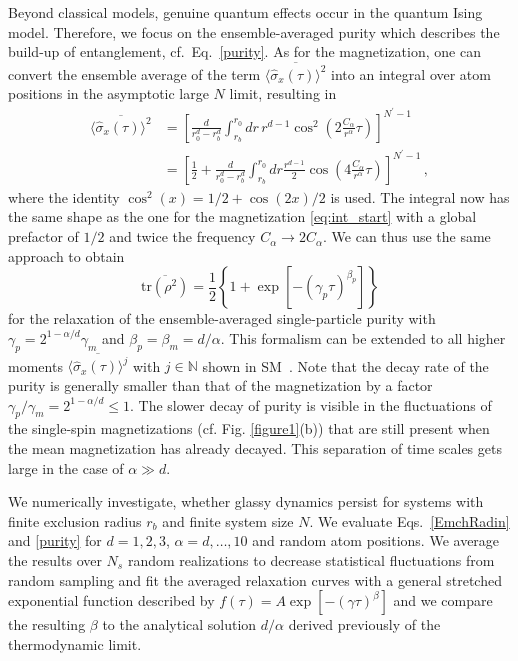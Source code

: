 \documentclass[aps,twocolumn,
superscriptaddress,
footinbib,
prl]{revtex4-1}
\begin{document}
Beyond classical models, genuine quantum effects occur in the quantum Ising model. Therefore, we focus on the ensemble-averaged purity which describes the build-up of entanglement, cf.\ Eq.~\eqref{purity}. As for the magnetization, one can convert the ensemble average of the term $\overline{\langle \hat{\sigma}_x(\tau) \rangle^2}$ into an integral over atom positions in the asymptotic large $N$ limit, resulting in
\begin{equation}
\begin{split}
        \overline{\langle \hat{\sigma}_x(\tau) \rangle^2} &= \left[\frac{d}{r_0^d - r_b^d} \int_{r_b}^{r_0} \! dr \, r^{d-1} \cos^2\left(2 \frac{ C_\alpha}{r^{\alpha}} \tau\right) \right]^{N^\prime-1} \\
        &= \left[\frac{1}{2} + \frac{d}{r_0^d - r_b^d} \int_{r_b}^{r_0} \! dr \frac{r^{d-1}}{2} \cos\left(4 \frac{ C_\alpha}{r^{\alpha}} \tau\right) \right]^{N^\prime-1} \,,
\end{split}
\end{equation}
where the identity $\cos^2(x) = 1/2 + \cos(2x)/2$ is used. The integral now has the same shape as the one for the magnetization \eqref{eq:int_start} with a global prefactor of $1/2$ and twice the frequency $C_\alpha \rightarrow 2 C_\alpha$. We can thus use the same approach to obtain 
\begin{equation}
    \overline{\mathrm{tr}(\rho^{2})} = \frac{1}{2}\left\{1+ \exp\left[-(\gamma_p \tau)^{\beta_p}\right]\right\}
\end{equation}
for the relaxation of the ensemble-averaged single-particle purity with $\gamma_p = 2^{1-\alpha/d}  \gamma_m$ and $\beta_p = \beta_m = d/\alpha$. This formalism can be extended to all higher moments $\overline{\langle \hat{\sigma}_x(\tau) \rangle^j}$ with $j \in \mathbb{N}$ shown in SM~\cite{SM}. Note that the decay rate of the purity is generally smaller than that of the magnetization by a factor $\gamma_p/\gamma_m= 2^{1-\alpha/d}\leq 1$.
The slower decay of purity is visible in the fluctuations of the single-spin magnetizations (cf. Fig. \ref{figure1}(b)) that are still present when the mean magnetization has already decayed. This separation of time scales gets large in the case of $\alpha \gg d$.

We numerically investigate, whether glassy dynamics persist for systems with finite exclusion radius $r_b$ and finite system size $N$. We evaluate Eqs.~\eqref{EmchRadin} and \eqref{purity} for $d=1,2,3$, $\alpha = d,\dots,10$ and random atom positions. We average the results over $N_s$ random realizations to decrease statistical fluctuations from random sampling and fit the averaged relaxation curves with a general stretched exponential function described by $f(\tau) = A \exp\left[ - (\gamma \tau)^\beta\right]$
and we compare the resulting $\beta$ to the analytical solution $d/\alpha$ derived previously of the thermodynamic limit. 
\end{document}
